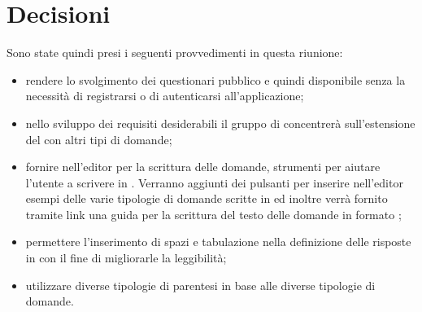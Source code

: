\documentclass[12pt,a4paper]{article}
\begin{document}
\section{Decisioni}

Sono state quindi presi i seguenti provvedimenti in questa riunione:

\begin{itemize}
    \item rendere lo svolgimento dei questionari pubblico e quindi disponibile senza la necessità di registrarsi o di autenticarsi all'applicazione;
    \item nello sviluppo dei requisiti desiderabili il gruppo di concentrerà sull'estensione del  con altri tipi di domande;
    \item fornire nell'editor per la scrittura delle domande, strumenti per aiutare l'utente a scrivere in . Verranno aggiunti dei pulsanti per inserire nell'editor esempi delle varie tipologie di domande scritte in  ed inoltre verrà fornito tramite link una guida per la scrittura del testo delle domande in formato ;
    \item permettere l'inserimento di spazi e tabulazione nella definizione delle risposte in  con il fine di migliorarle la leggibilità;
    \item utilizzare diverse tipologie di parentesi in base alle diverse tipologie di domande.
    
\end{itemize}
\end{document}
